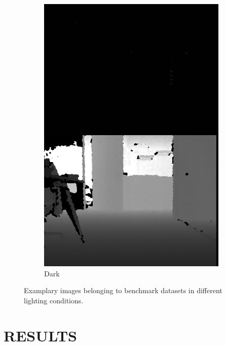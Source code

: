 \documentclass[]{spie}  %
\begin{document}
\begin{figure}[!htb]
\begin{subfigure}[b]{0.27\textwidth}
        \includegraphics[trim = 0mm 0mm 0mm 0mm, clip, width=\textwidth]{figures/dataset_dark.png}    
        \caption{Dark}
        \label{subfig:dataset_dark}
        \end{subfigure}
        
        \hspace{-3mm}
        \caption{Examplary images belonging to benchmark datasets in different lighting conditions.}
        \label{fig:dataset}
\end{figure}


\section{RESULTS}
\label{sec:results}
\end{document}
